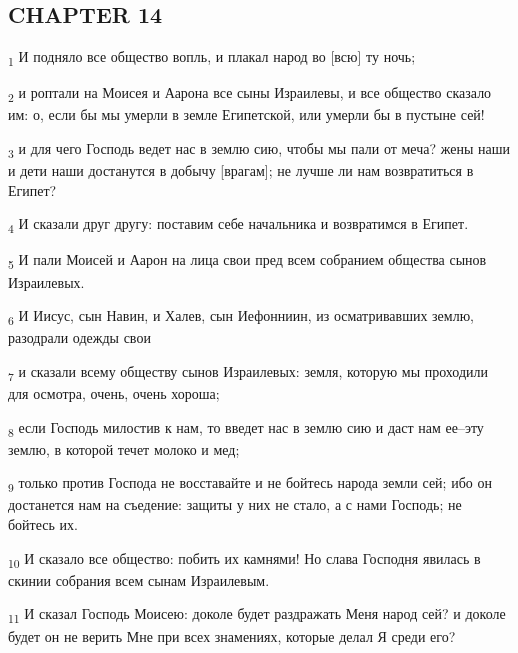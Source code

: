 \subsection{CHAPTER 14}
\begin{tcolorbox}
\textsubscript{1} И подняло все общество вопль, и плакал народ во [всю] ту ночь;
\end{tcolorbox}
\begin{tcolorbox}
\textsubscript{2} и роптали на Моисея и Аарона все сыны Израилевы, и все общество сказало им: о, если бы мы умерли в земле Египетской, или умерли бы в пустыне сей!
\end{tcolorbox}
\begin{tcolorbox}
\textsubscript{3} и для чего Господь ведет нас в землю сию, чтобы мы пали от меча? жены наши и дети наши достанутся в добычу [врагам]; не лучше ли нам возвратиться в Египет?
\end{tcolorbox}
\begin{tcolorbox}
\textsubscript{4} И сказали друг другу: поставим себе начальника и возвратимся в Египет.
\end{tcolorbox}
\begin{tcolorbox}
\textsubscript{5} И пали Моисей и Аарон на лица свои пред всем собранием общества сынов Израилевых.
\end{tcolorbox}
\begin{tcolorbox}
\textsubscript{6} И Иисус, сын Навин, и Халев, сын Иефонниин, из осматривавших землю, разодрали одежды свои
\end{tcolorbox}
\begin{tcolorbox}
\textsubscript{7} и сказали всему обществу сынов Израилевых: земля, которую мы проходили для осмотра, очень, очень хороша;
\end{tcolorbox}
\begin{tcolorbox}
\textsubscript{8} если Господь милостив к нам, то введет нас в землю сию и даст нам ее--эту землю, в которой течет молоко и мед;
\end{tcolorbox}
\begin{tcolorbox}
\textsubscript{9} только против Господа не восставайте и не бойтесь народа земли сей; ибо он достанется нам на съедение: защиты у них не стало, а с нами Господь; не бойтесь их.
\end{tcolorbox}
\begin{tcolorbox}
\textsubscript{10} И сказало все общество: побить их камнями! Но слава Господня явилась в скинии собрания всем сынам Израилевым.
\end{tcolorbox}
\begin{tcolorbox}
\textsubscript{11} И сказал Господь Моисею: доколе будет раздражать Меня народ сей? и доколе будет он не верить Мне при всех знамениях, которые делал Я среди его?
\end{tcolorbox}
